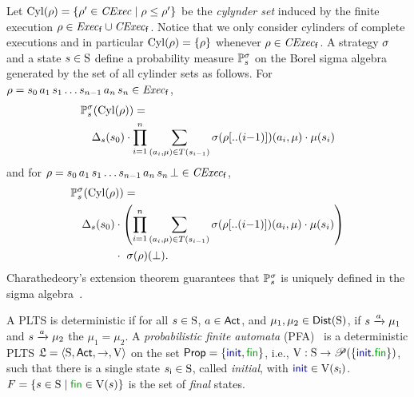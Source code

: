 Let $\Cyl(\rho)=\{\rho'\in\cexec\mid{\rho\leq\rho'}\}$ be the
\emph{cylynder set} induced by the finite execution
$\rho\in\execf\cup\cexecf$.  Notice that we only consider cylinders of
complete executions and in particular $\Cyl(\rho)=\{\rho\}$ whenever
$\rho\in\cexecf$.
%
A strategy $\strat$ and a state $s\in\S$ define a probability
measure $\Prob^\strat_s$ on the Borel sigma algebra generated by the
set of all cylinder sets as follows.
%
For $\rho = s_0\, a_1\, s_1\ldots s_{n-1}\, a_n\, s_n \in \execf$,
%
\begin{align}
  &\Prob^\strat_s(\Cyl(\rho)) = {}\label{eq:def:prob:i}\\
  &\quad \Dirac_s(s_0)\cdot\prod\limits_{i=1}^n\sum\limits_{(a_i,\mu)\in T(s_{i-1})}\strat(\rho[..(i{-}1)])(a_i,\mu)\cdot\mu(s_i)\notag
\end{align}
%
and for
$\rho = s_0\, a_1\, s_1\ldots s_{n-1}\, a_n\, s_n\, \complete \in \cexecf$,
%
\begin{align}
  &\Prob^\strat_s(\Cyl(\rho)) = {}\label{eq:def:prob:ii}\\
  &\quad \Dirac_s(s_0)\cdot\left(\prod\limits_{i=1}^n\sum\limits_{(a_i,\mu)\in T(s_{i-1})}\strat(\rho[..(i{-}1)])(a_i,\mu)\cdot\mu(s_i)\right)\notag\\
  &\phantom{\quad \Dirac_s(s_0)} \cdot \ \strat(\rho)(\complete).\notag
\end{align}
%
Charathedeory's extension theorem guarantees that $\Prob^\strat_s$ is
uniquely defined in the sigma algebra~\cite{Segala95}.




A PLTS is deterministic if for all $s\in\S$, $a\in\Act$, and
$\mu_1,\mu_2\in\Dist(\S)$, if $s\reach{a}\mu_1$ and $s\reach{a}\mu_2$
the $\mu_1=\mu_2$.
%
A \emph{probabilistic finite automata} (PFA)~\cite{Rabin63,Paz71} is a
deterministic PLTS $\model=\tup{\S,\Act,\ra,\V}$ on the set
$\Prop=\{\init,\fin\}$, i.e., $\V:\S\to\powerset(\{\init.\fin\})$,
such that there is a single state $s_{\textsf{i}}\in\S$, called
\emph{initial}, with $\init\in\V(s_{\textsf{i}})$.
%
$F=\{{s\in\S}\mid{\fin\in\V(s)}\}$ is the set of \emph{final} states.

